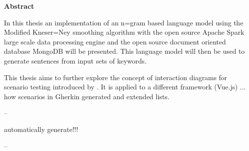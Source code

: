 \thispagestyle{empty}
\begin{center}
    
    \vspace{0.9cm}
    \large{}
    \textbf{Abstract}

\end{center}
\begin{center}
\vspace{0.3cm}
\large{}
\vspace{0.4cm}
     
In this thesis an implementation of an n=gram based language model using the Modified Kneser=Ney smoothing algorithm with the open source Apache Spark large scale data processing engine and the open source document oriented database MongoDB will be presented. This language model will then be used to generate sentences from input sets of keywords.
     

This thesis aims to further explore the concept of interaction diagrams for scenario testing introduced  by \cite{zhang2019scenario}. It is applied to a different framework (Vue.js) ... how scenarios in Gherkin generated and extended lists. 

--

automatically generate!!!

--

\end{center}